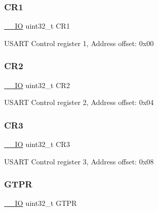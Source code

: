 \subsubsection{\texorpdfstring{C\+R1}{CR1}}
{\footnotesize\ttfamily \hyperlink{core__sc300_8h_aec43007d9998a0a0e01faede4133d6be}{\+\_\+\+\_\+\+IO} uint32\+\_\+t C\+R1}

U\+S\+A\+RT Control register 1, Address offset\+: 0x00 \mbox{\label{struct_u_s_a_r_t___type_def_afdfa307571967afb1d97943e982b6586}} 
\subsubsection{\texorpdfstring{C\+R2}{CR2}}
{\footnotesize\ttfamily \hyperlink{core__sc300_8h_aec43007d9998a0a0e01faede4133d6be}{\+\_\+\+\_\+\+IO} uint32\+\_\+t C\+R2}

U\+S\+A\+RT Control register 2, Address offset\+: 0x04 \mbox{\label{struct_u_s_a_r_t___type_def_add5b8e29a64c55dcd65ca4201118e9d1}} 
\subsubsection{\texorpdfstring{C\+R3}{CR3}}
{\footnotesize\ttfamily \hyperlink{core__sc300_8h_aec43007d9998a0a0e01faede4133d6be}{\+\_\+\+\_\+\+IO} uint32\+\_\+t C\+R3}

U\+S\+A\+RT Control register 3, Address offset\+: 0x08 \mbox{\label{struct_u_s_a_r_t___type_def_a5dd0cb6c861eaf26470f56f451c1edbf}} 
\subsubsection{\texorpdfstring{G\+T\+PR}{GTPR}}
{\footnotesize\ttfamily \hyperlink{core__sc300_8h_aec43007d9998a0a0e01faede4133d6be}{\+\_\+\+\_\+\+IO} uint32\+\_\+t G\+T\+PR}


